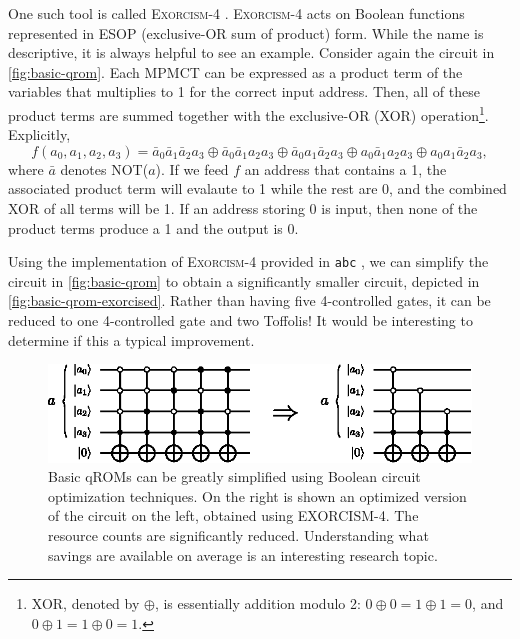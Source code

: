 \documentclass[a4paper,12pt]{article}
\begin{document}
One such tool is called \textsc{Exorcism-4} \cite{Mishchenko2001}. \textsc{Exorcism-4} acts on Boolean functions represented in ESOP (exclusive-OR sum of product) form.
While the name is descriptive, it is always helpful to see an example.
Consider again the circuit in \autoref{fig:basic-qrom}. 
Each MPMCT can be expressed as a product term of the variables that multiplies to 1 for the correct input address.
Then, all of these product terms are summed together with the exclusive-OR (XOR) operation\footnote{XOR, denoted by $\oplus$, is essentially addition modulo 2: $0 \oplus 0 = 1 \oplus 1 = 0$, and $0 \oplus 1 = 1 \oplus 0 = 1$.}.
Explicitly,
\begin{equation}
 f(a_0, a_1, a_2, a_3) = \bar{a}_0 \bar{a}_1 \bar{a}_2 a_3 \oplus \bar{a}_0 \bar{a}_1 a_2 a_3 \oplus \bar{a}_0 a_1 \bar{a}_2 a_3 \oplus a_0 \bar{a}_1 a_2 a_3 \oplus a_0 a_1 \bar{a}_2 a_3,
\end{equation}
where $\bar{a}$ denotes NOT($a$).
If we feed $f$ an address that contains a 1, the associated product term will evalaute to 1 while the rest are 0, and the combined XOR of all terms will be 1.
If an address storing 0 is input, then none of the product terms produce a 1 and the output is 0.

Using the implementation of \textsc{Exorcism-4} provided in \texttt{abc} \cite{abc}, we can simplify the circuit in \autoref{fig:basic-qrom} to obtain a significantly smaller circuit, depicted in \autoref{fig:basic-qrom-exorcised}. 
Rather than having five 4-controlled gates, it can be reduced to one 4-controlled gate and two Toffolis! 
It would be interesting to determine if this a typical improvement.

\begin{figure}[ht]
 \centering
 \captionsetup{width=0.89\linewidth}
 \includegraphics[scale=1.6]{images/basic-qrom-exorcised}
 \caption{Basic qROMs can be greatly simplified using Boolean circuit optimization techniques. On the right is shown an optimized version of the circuit on the left, obtained using EXORCISM-4. The resource counts are significantly reduced. Understanding what savings are available on average is an interesting research topic.}
 \label{fig:basic-qrom-exorcised}
\end{figure}
\end{document}
